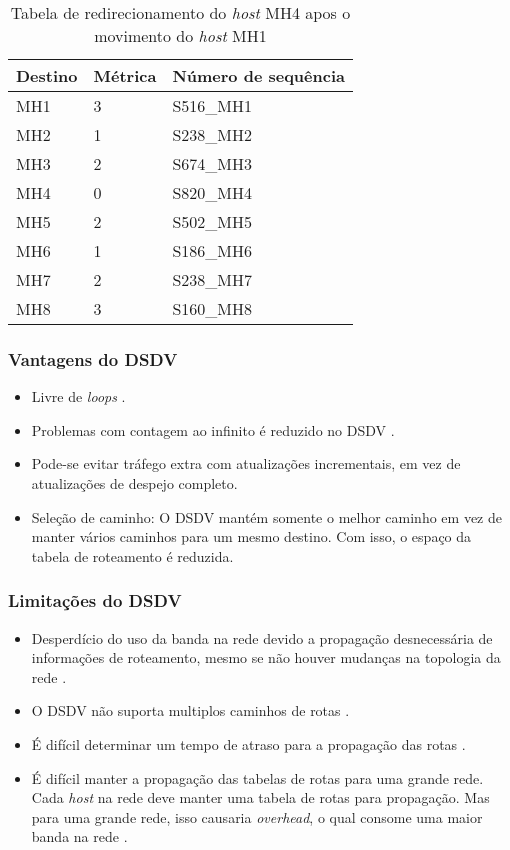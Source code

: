\begin{table}[H]
	\centering
	\begin{tabular}{ | l | l | l | }
		\hline
		Destino & M\'etrica & N\'umero de sequ\^encia \\ \hline
		MH1 & 3 & S516\_MH1 \\ \hline
		MH2 & 1 & S238\_MH2 \\ \hline
		MH3 & 2 & S674\_MH3 \\ \hline
		MH4 & 0 & S820\_MH4 \\ \hline
		MH5 & 2 & S502\_MH5 \\ \hline
		MH6 & 1 & S186\_MH6 \\ \hline
		MH7 & 2 & S238\_MH7 \\ \hline
		MH8 & 3 & S160\_MH8 \\ \hline
	\end{tabular}
	\caption{Tabela de redirecionamento do \textit{host} MH4 apos o movimento do \textit{host} MH1 \cite{pebha} }
	\label{tabNewRdMH4}
\end{table}

\subsubsection{Vantagens do DSDV}
\begin{itemize}
	\item Livre de \textit{loops} \cite{gorantala}.
	\item Problemas com contagem ao infinito \'e reduzido no DSDV \cite{gorantala}.
	\item Pode-se evitar tr\'afego extra com atualiza\c{c}\~oes incrementais, em vez de atualiza\c{c}\~oes de despejo completo.
	\item Sele\c{c}\~ao de caminho: O DSDV mant\'em somente o melhor caminho em vez de manter v\'arios caminhos para um mesmo destino. Com isso, o espa\c{c}o da tabela de roteamento \'e reduzida.
\end{itemize}

\subsubsection{Limita\c{c}\~ oes do DSDV}
\begin{itemize}
	\item Desperd\'icio do uso da banda na rede devido a propaga\c{c}\~ao desnecess\'aria de informa\c{c}\~oes de roteamento, mesmo se n\~ao houver mudan\c{c}as na topologia da rede \cite{Patel00energyin}.	
	\item O DSDV n\~ao suporta multiplos caminhos de rotas \cite{gorantala}.
	\item \'E dif\'icil determinar um tempo de atraso para a propaga\c{c}\~ao das rotas \cite{heg}.
	\item \'E dif\'icil manter a propaga\c{c}\~ao das tabelas de rotas para uma grande rede. Cada \textit{host} na rede deve manter uma tabela de rotas para propaga\c{c}\~ao. Mas para uma grande rede, isso causaria \textit{overhead}, o qual consome uma maior banda na rede \cite{gorantala}.
\end{itemize}
